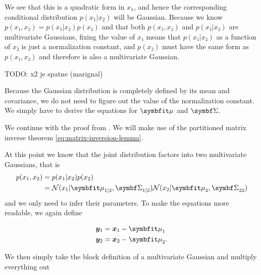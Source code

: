 We see that this is a quadratic form in $x_1$, and hence the corresponding
conditional distribution $p(x_1 | x_2)$ will be Gaussian. Because we know
$p(x₁, x₂) = p(x₁|x₂)p(x₂)$ and that both $p(x₁, x₂)$ and $p(x₁|x₂)$ are
multivariate Gaussians, fixing the value of $x₁$ means that $p(x₁|x₂)$ as a
function of $x₂$ is just a normalization constant, and $p(x₂)$ must have the
same form as $p(x₁, x₂)$ and therefore is also a multivariate Gaussian.

TODO: x2 je spatne (marignal)

Because the Gaussian distribution is completely defined by its mean and
covariance, we do not need to figure out the value of the normalization
constant. We simply have to derive the equations for $\vmu$ and $\mSigma$.

We continue with the proof from \cite{murphy2012machine}. We will make use of
the partitioned matrix inverse theorem \autoref{eq:matrix-inversion-lemma}.

At this point we know that the joint distribution factors into two multivariate
Gaussians, that is
\begin{align}
  p(x_1, x_2) &= p(x_1 | x_2) p(x_2) \\
              &= \gN(x_1 | \vmu_{1|2}, \ms{1|2}) \gN(x_2 | \vmu_2, \ms{22})
\end{align}
and we only need to infer their parameters.  To make the equations more
readable, we again define

\begin{align}
    \vy_1 &= \vx_1 - \vmu_1 \\
    \vy_2 &= \vx_2 - \vmu_2.
\end{align}

We then simply take the block definition of a multivariate Gaussian and
multiply everything out

